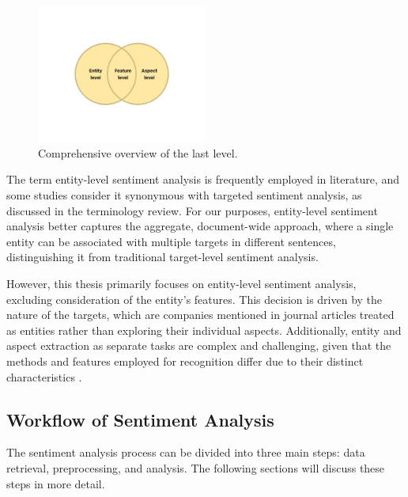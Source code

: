 \begin{figure}[H]
    \centering
    \includegraphics[width=0.5\textwidth]{img/entity-feature-aspect-level.pdf}
    \caption{Comprehensive overview of the last level.}
    \label{fig:enity-feature-aspect-level}
\end{figure}


The term entity-level sentiment analysis is frequently employed in literature, and some studies consider it synonymous with targeted sentiment analysis, \linebreak as discussed \cite{ronningstad-etal-2022-entity} in the terminology review. For our purposes, entity-level sentiment analysis better captures the aggregate, document-wide approach, where a single entity can be associated with multiple targets in different sentences, distinguishing it from traditional target-level sentiment analysis. 

However, this thesis primarily focuses on entity-level sentiment analysis, excluding consideration of the entity's features. This decision is driven by the nature of the targets, which are companies mentioned in journal articles treated as entities rather than exploring their individual aspects. Additionally, entity and aspect extraction as separate tasks are complex and challenging, given that the methods and features employed for recognition differ due to their distinct characteristics \parencite{Liu2015, Zhang2014}. 

\subsection{Workflow of Sentiment Analysis}
\label{subsec:workflow-of-sentiment-analysis}
The sentiment analysis process can be divided into three main steps: data retrieval, preprocessing, and analysis. The following sections will discuss these steps in more detail.

